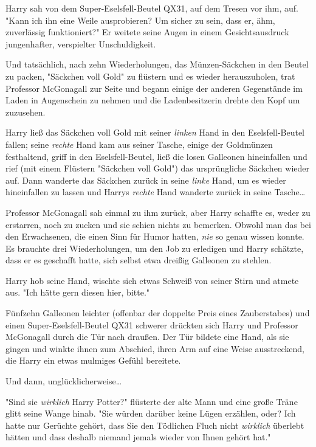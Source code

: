 {Harry sah von dem Super-Eselsfell-Beutel QX31, auf dem Tresen vor ihm, auf. "Kann ich ihn eine Weile ausprobieren? Um sicher zu sein, dass er, ähm, zuverlässig funktioniert?" Er weitete seine Augen in einem Gesichtsausdruck jungenhafter, verspielter Unschuldigkeit.

Und tatsächlich, nach zehn Wiederholungen, das Münzen-Säckchen in den Beutel zu packen, "Säckchen voll Gold" zu flüstern und es wieder herauszuholen, trat Professor McGonagall zur Seite und begann einige der anderen Gegenstände im Laden in Augenschein zu nehmen und die Ladenbesitzerin drehte den Kopf um zuzusehen.

Harry ließ das Säckchen voll Gold mit seiner \emph{linken} Hand in den Eselsfell-Beutel fallen; seine \emph{rechte} Hand kam aus seiner Tasche, einige der Goldmünzen festhaltend, griff in den Eselsfell-Beutel, ließ die losen Galleonen hineinfallen und rief (mit einem Flüstern "Säckchen voll Gold") das ursprüngliche Säckchen wieder auf. Dann wanderte das Säckchen zurück in seine \emph{linke} Hand, um es wieder hineinfallen zu lassen und Harrys \emph{rechte} Hand wanderte zurück in seine Tasche…

Professor McGonagall sah einmal zu ihm zurück, aber Harry schaffte es, weder zu erstarren, noch zu zucken und sie schien nichts zu bemerken. Obwohl man das bei den Erwachsenen, die einen Sinn für Humor hatten, \emph{nie} so genau wissen konnte. Es brauchte drei Wiederholungen, um den Job zu erledigen und Harry schätzte, dass er es geschafft hatte, sich selbst etwa dreißig Galleonen zu stehlen.

Harry hob seine Hand, wischte sich etwas Schweiß von seiner Stirn und atmete aus. "Ich hätte gern diesen hier, bitte."

Fünfzehn Galleonen leichter (offenbar der doppelte Preis eines Zauberstabes) und einen Super-Eselsfell-Beutel QX31 schwerer drückten sich Harry und Professor McGonagall durch die Tür nach draußen. Der Tür bildete eine Hand, als sie gingen und winkte ihnen zum Abschied, ihren Arm auf eine Weise ausstreckend, die Harry ein etwas mulmiges Gefühl bereitete.

Und dann, unglücklicherweise…

"Sind sie \emph{wirklich} Harry Potter?" flüsterte der alte Mann und eine große Träne glitt seine Wange hinab. "Sie würden darüber keine Lügen erzählen, oder? Ich hatte nur Gerüchte gehört, dass Sie den Tödlichen Fluch nicht \emph{wirklich} überlebt hätten und dass deshalb niemand jemals wieder von Ihnen gehört hat."

}
